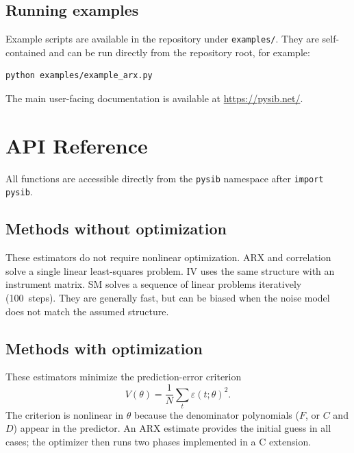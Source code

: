 \documentclass[11pt,a4paper]{article}
\begin{document}
\subsection{Running examples}

Example scripts are available in the repository under \texttt{examples/}.
They are self-contained and can be run directly from the repository root,
for example:

\begin{lstlisting}
python examples/example_arx.py
\end{lstlisting}

The main user-facing documentation is available at
\url{https://pysib.net/}.

\newpage
\section{API Reference}

All functions are accessible directly from the \texttt{pysib} namespace
after \texttt{import pysib}.

\subsection{Methods without optimization}

These estimators do not require nonlinear optimization.
ARX and correlation solve a single linear least-squares problem.
IV uses the same structure with an instrument matrix.
SM solves a sequence of linear problems iteratively (100~steps).
They are generally fast, but can be biased when the noise model
does not match the assumed structure.






\newpage
\subsection{Methods with optimization}

These estimators minimize the prediction-error criterion
\[
  V(\theta) = \frac{1}{N}\sum_t \varepsilon(t;\theta)^2.
\]
The criterion is nonlinear in $\theta$ because the denominator
polynomials ($F$, or $C$ and $D$) appear in the predictor.
An ARX estimate provides the initial guess in all cases; the optimizer
then runs two phases implemented in a C extension.
\end{document}
